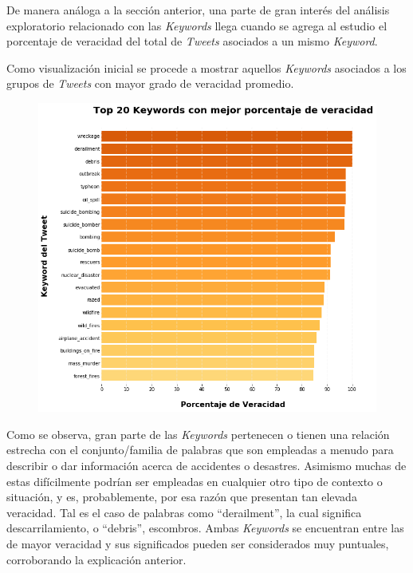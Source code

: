 \documentclass[titlepage,a4paper]{article}
\begin{document}
    De manera análoga a la sección anterior, una parte de gran interés del análisis exploratorio relacionado con las \textit{Keywords} llega cuando se agrega al estudio el porcentaje de veracidad del total de \textit{Tweets} asociados a un mismo \textit{Keyword}.    
    
    Como visualización inicial se procede a mostrar aquellos \textit{Keywords} asociados a los grupos de \textit{Tweets} con mayor grado de veracidad promedio.
    
    \begin{figure}[H]
    \centering
    \includegraphics[width=1\textwidth]{graficos/Analisis de Keyword/top_10_keywords_con_mejor_porcentaje_de_veracidad.png}
    \caption{} 
    \end{figure}
    
    Como se observa, gran parte de las \textit{Keywords} pertenecen o tienen una relación estrecha con el conjunto/familia de palabras que son empleadas a menudo para describir o dar información acerca de accidentes o desastres. Asimismo muchas de estas difícilmente podrían ser empleadas en cualquier otro tipo de contexto o situación, y es, probablemente, por esa razón que presentan tan elevada veracidad. Tal es el caso de palabras como ``derailment'', la cual significa descarrilamiento, o ``debris'', escombros. Ambas \textit{Keywords} se encuentran entre las de mayor veracidad y sus significados pueden ser considerados muy puntuales, corroborando la explicación anterior. 
    
\end{document}
